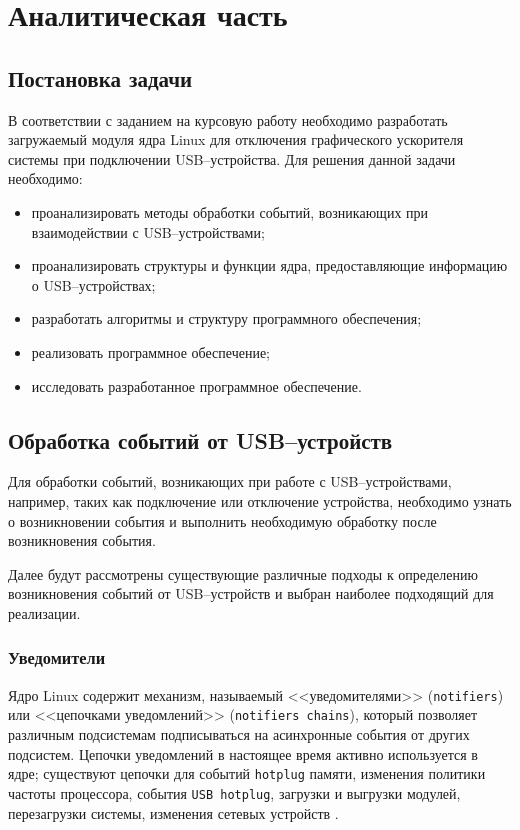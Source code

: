 \chapter{Аналитическая часть}

\section{Постановка задачи}

В соответствии с заданием на курсовую работу необходимо разработать загружаемый модуля ядра Linux для отключения графического ускорителя системы при подключении USB--устройства. Для решения данной задачи необходимо:

\begin{itemize}
	\item проанализировать методы обработки событий, возникающих при взаимодействии с USB--устройствами;
	\item проанализировать структуры и функции ядра, предоставляющие информацию о USB--устройствах;
	\item разработать алгоритмы и структуру программного обеспечения;
	\item реализовать программное обеспечение;
	\item исследовать разработанное программное обеспечение.
\end{itemize}

\section{Обработка событий от USB--устройств}

Для обработки событий, возникающих при работе с USB--устройствами, например, таких как подключение или отключение устройства, необходимо узнать о возникновении события и выполнить необходимую обработку после возникновения события.

Далее будут рассмотрены существующие различные подходы к определению возникновения событий от USB--устройств и выбран наиболее подходящий для реализации.

\newpage
\subsection{Уведомители}

Ядро Linux содержит механизм, называемый <<уведомителями>> (\texttt{notifiers}) или <<цепочками уведомлений>> (\texttt{notifiers chains}), который позволяет различным подсистемам подписываться на асинхронные события от других подсистем. Цепочки уведомлений в настоящее время активно используется в ядре; существуют цепочки для событий \texttt{hotplug} памяти, изменения политики частоты процессора, события \texttt{USB hotplug}, загрузки и выгрузки модулей, перезагрузки системы, изменения сетевых устройств \cite{notifications}.

